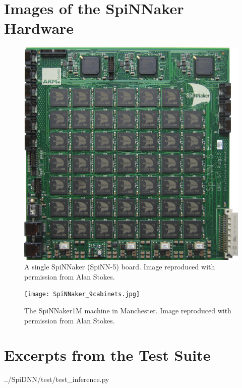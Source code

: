 \documentclass[]{article}
\begin{document}
\begin{appendices}
\section{Images of the SpiNNaker Hardware}
\label{sec:spinn_photos}

\begin{figure}[H]
  \includegraphics[width=\linewidth]{spinnakerBoard.jpg}
  \caption{A single SpiNNaker (SpiNN-5) board.
  Image reproduced with permission from Alan Stokes.}
\end{figure}

\begin{figure}[H]
  \texttt{[image: SpiNNaker\_9cabinets.jpg]}
  \caption{The SpiNNaker1M machine in Manchester.
  Image reproduced with permission from Alan Stokes.}
\end{figure}

\newpage

\section{Excerpts from the Test Suite}
\label{sec:test_suite}


  {../SpiDNN/test/test_inference.py}


\end{appendices}
\end{document}
